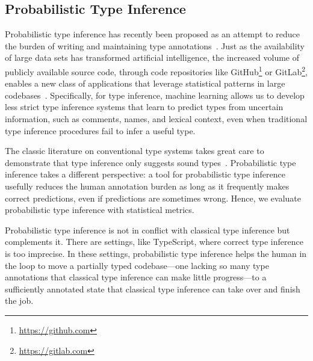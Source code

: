 \documentclass[acmsmall, review, anonymous]{acmart}\settopmatter{printfolios=true,printccs=false,printacmref=false}
\begin{document}
\subsection{Probabilistic Type Inference}
Probabilistic type inference
has recently been proposed as an attempt to reduce the burden
of writing and maintaining type
annotations~\cite{wei20,raychev15,hellendoorn18}.
Just as the availability of large data sets has transformed artificial intelligence,
the increased volume of publicly available source code, through
code repositories like GitHub\footnote{\href{https://github.com}{https://github.com}}
or GitLab\footnote{\href{https://gitlab.com}{https://gitlab.com}},
enables a new class of applications that leverage statistical
patterns in large codebases~\cite{allamanis17}.
Specifically, for type inference, machine learning
allows us to develop less strict type inference systems
that learn to predict types from uncertain information,
such as comments, names, and lexical context,
even when traditional type inference procedures
fail to infer a useful type.

The classic literature on conventional type systems takes great care to demonstrate
that type inference only suggests sound types~\cite{DBLP:journals/jcss/Milner78,Pierce2002}.
Probabilistic type inference takes a different perspective:
a tool for probabilistic type inference usefully reduces the human annotation burden
as long as it frequently makes correct predictions, even if predictions are sometimes wrong.
Hence, we evaluate probabilistic type inference with statistical metrics.

Probabilistic type inference is not in conflict with classical type inference but complements it.
There are settings, like TypeScript, where correct type inference is too imprecise.
In these settings, probabilistic type inference helps the human in the loop to move a
partially typed codebase---one lacking so many type annotations that classical type inference
can make little progress---to a sufficiently annotated state that classical type inference can take over and finish the job.
\end{document}
